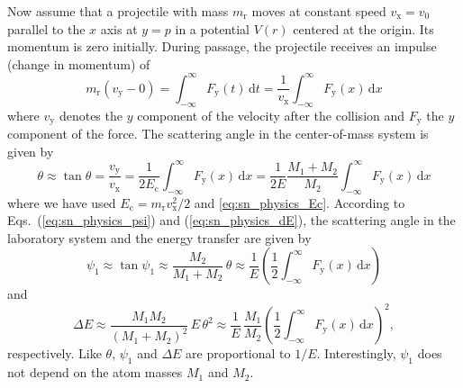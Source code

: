 Now assume that a projectile with mass $m_\mathrm{r}$ moves at constant speed $v_\mathrm{x} = v_0$ parallel to the $x$ axis at $y = p$ in a potential $V(r)$ centered at the origin. Its momentum is zero initially. During passage, the projectile receives an impulse (change in momentum) of
%
\begin{equation}
    \label{eq:sn_impulse_Fy}
    m_\mathrm{r} (v_\mathrm{y} - 0)
        = \int_{-\infty}^{\infty} F_\mathrm{y}(t) \, \mathrm{d}t
        = \frac{1}{v_\mathrm{x}}\int_{-\infty}^{\infty} F_\mathrm{y}(x) \, \mathrm{d}x
\end{equation}
%
where $v_\mathrm{y}$ denotes the $y$ component of the velocity after the collision and $F_\mathrm{y}$ the $y$ component of the force.
The scattering angle in the center-of-mass system is given by
%
\begin{equation}
    \label{eq:sn_theta_impulse_Fy}
    \theta \approx \tan \theta = \frac{v_\mathrm{y}}{v_\mathrm{x}}
    = \frac{1}{2 E_\mathrm{c}} \int_{-\infty}^{\infty} F_\mathrm{y}(x) \, \mathrm{d}x
    = \frac{1}{2 E} \frac{M_1+M_2}{M_2} \int_{-\infty}^{\infty} F_\mathrm{y}(x) \, \mathrm{d}x
\end{equation}
%
where we have used $E_\mathrm{c} = m_\mathrm{r} v_\mathrm{x}^2 / 2$ and \cref{eq:sn_physics_Ec}.
According to Eqs.~(\ref{eq:sn_physics_psi}) and (\ref{eq:sn_physics_dE}), the scattering angle in the laboratory system and the energy transfer are given by
%
\begin{equation}
    \label{eq:sn_impulse_psi_Fy}
    \psi_1 \approx \tan \psi_1 \approx \frac{M_2}{M_1 + M_2} \, \theta
    \approx \frac{1}{E} \left(
        \frac{1}{2} \int_{-\infty}^{\infty} F_\mathrm{y}(x) \, \mathrm{d}x
    \right)
\end{equation}
%
and
%
\begin{equation}
    \label{eq:sn_impulse_dE_Fy}
    \Delta E \approx \frac{M_1 M_2}{(M_1 + M_2)^2} \, E \, \theta^2
    \approx \frac{1}{E} \, \frac{M_1}{M_2} \left(
        \frac{1}{2} \int_{-\infty}^{\infty} F_\mathrm{y}(x) \, \mathrm{d}x
    \right)^2  ,
\end{equation}
%
respectively.
Like $\theta$, $\psi_1$ and $\Delta E$ are proportional to $1/E$.
Interestingly, $\psi_1$ does not depend on the atom masses $M_1$ and $M_2$.

